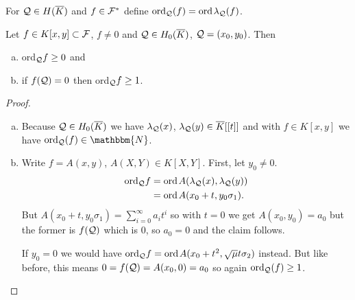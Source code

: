 \documentclass[english,11pt,a4paper]{article}
\begin{document}
\begin{defin}
   For $\mathcal{Q} \in H(\overline K)$ and $f \in \mathcal{F}^*$ define $\text{ord}_{\mathcal{Q}} (f) = \text{ord\hspace{0.4mm}} \lambda_{\mathcal{Q}} (f)$.
\end{defin}


\begin{lemma}\label{one}
  Let $f \in K[x,y] \subset \mathcal{F}$, $f \neq 0$ and $\mathcal{Q} \in H_0(\overline K)$, $\mathcal{Q} = (x_0,y_0)$. Then
  \begin{enumerate}[(a)]\parskip 1mm
	  \item ord$_{\mathcal{Q}} f \geq 0$ and
	  \item if $f(\mathcal{Q}) = 0$ then ord$_{\mathcal{Q}} f \geq 1$.
	\end{enumerate}\parskip 3mm
	\begin{proof}\hfill
		\begin{enumerate}[(a)]\parskip 1mm
	  	\item Because $\mathcal{Q} \in H_0(\overline K)$ we have $\lambda_{\mathcal{Q}}(x)$, $\lambda_{\mathcal{Q}}(y) \in \overline K[[t]]$ and with $f \in K[x,y]$ we have $\ordq (f) \in \mathbbm{N}$.
	  	\item Write $f = A(x,y)$, $A(X,Y) \in K[X,Y]$. First, let $y_0 \neq 0$.
	  	\begin{align*}
	  	  \text{ord}_{\mathcal{Q}} f &= \text{ord\hspace{0.4mm}} A(\lambda_{\mathcal{Q}}(x), \lambda_{\mathcal{Q}}(y))\\
	  	  &= \text{ord\hspace{0.4mm}} A(x_0 + t, y_0 \sigma_1).
	  	\end{align*}
	  	But $A(x_0 + t, y_0 \sigma_1)=\sum_{i=0}^{\infty} a_i t^i$ so with $t=0$ we get $A(x_0, y_0)=a_0$ but the former is $f(\mathcal{Q})$ which is $0$, so $a_0 = 0$ and the claim follows.

	  	If $y_0 = 0$ we would have $\text{ord}_{\mathcal{Q}} f = \text{ord\hspace{0.4mm}} A(x_0 + t^2, \sqrt \mu t \sigma_2)$ instead. But like before, this means $0 = f(\mathcal{Q}) = A(x_0, 0) = a_0$ so again $\text{ord}_{\mathcal{Q}} (f) \geq 1$.
		\end{enumerate}\parskip 3mm
	\end{proof}
\end{lemma}
\end{document}
